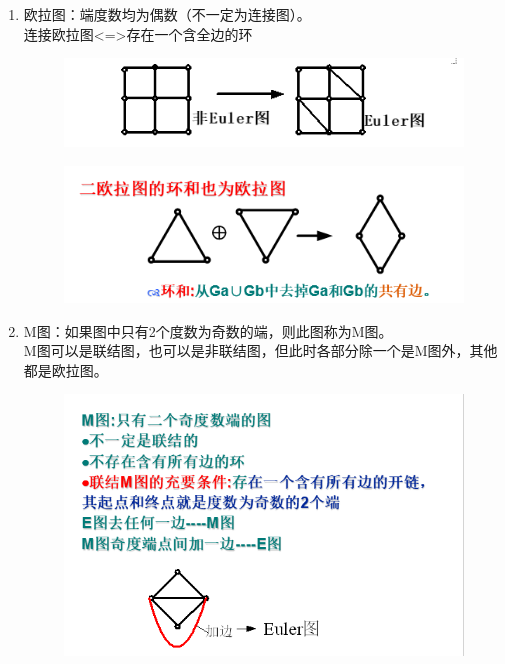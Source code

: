 \begin{enumerate}
	\item 欧拉图：端度数均为偶数（不一定为连接图）。\\
连接欧拉图<=>存在一个含全边的环	
\begin{figure}[H]
	\centering
	\includegraphics[width=0.7\linewidth]{figures/screenshot049}
	\caption{}
	\label{fig:screenshot049}
\end{figure}
	\begin{figure}[H]
		\centering
		\includegraphics[width=0.7\linewidth]{figures/screenshot050}
		\caption{}
		\label{fig:screenshot050}
	\end{figure}
	
	\item M图：如果图中只有2个度数为奇数的端，则此图称为M图。\\
	M图可以是联结图，也可以是非联结图，但此时各部分除一个是M图外，其他都是欧拉图。
	\begin{figure}[H]
		\centering
		\includegraphics[width=0.7\linewidth]{figures/screenshot051}
		\caption{}
		\label{fig:screenshot051}
	\end{figure}
	

\end{enumerate}
